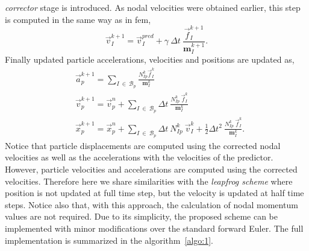 \documentclass[preprint,12pt,a4paper]{elsarticle}
\newcommand{\tens}[1]{
  \ensuremath{\mathbf{{#1}}}
}
\begin{document}
\textit{corrector} stage is introduced. As nodal
velocities were obtained earlier, this step is computed in the same way as
in \acrshort{fem},
\begin{equation}
  \label{eq:Corrector-velocity}
  \vec{v}_{I}^{k+1} = \vec{v}_{I}^{pred} + \gamma\ \Delta t\ \frac{\vec{f}_{I}^{k+1}}{\tens{m}_I^{k+1}}.
\end{equation}
Finally updated particle accelerations, velocities and positions are updated as,
\begin{align}
  \label{eq:Update-lagrangian-pce}
        &\vec{a}_p^{k+1} = \sum_{I\ \in\ \mathcal{B}_p} \frac{N_{Ip}^k\vec{f}_{I}^{k}}{\tens{m}_I^k}\\
      &\vec{v}_p^{k+1} = \vec{v}_p^n + \sum_{I\ \in\ \mathcal{B}_p} \Delta t\
        \frac{N_{Ip}^k\
        \vec{f}_{I}^{k}}{\tens{m}_I^k}\\
      &\vec{x}_p^{k+1} = \vec{x}_p^n + \sum_{I\ \in\ \mathcal{B}_p} \Delta t\
         N_{Ip}^k\ \vec{v}_{I}^{k} +
        \frac{1}{2}\Delta t^2\ \frac{N_{Ip}^k\
        \vec{f}_{I}^{k}}{\tens{m}_I^k}.
\end{align}
Notice that particle displacements are computed using the corrected
nodal velocities as well as the accelerations with the velocities
of the predictor. However, particle velocities and accelerations
are computed using the corrected velocities. Therefore here we share similarities
with the \textit{leapfrog scheme} where position is not updated at
full time step, but the velocity is updated at half time steps. Notice
also that, with this approach, the calculation of nodal momentum values
are not required. Due to its simplicity, the proposed scheme can be implemented with minor modifications over the standard forward Euler. The full implementation is summarized in the algorithm~\ref{algo:1}.
\end{document}
